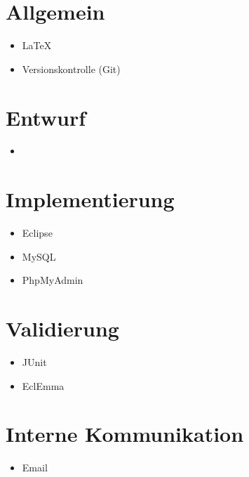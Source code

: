 
\section{Allgemein}
\begin{itemize}
	\item LaTeX
	\item Versionskontrolle (Git)
\end{itemize}
\section{Entwurf}
\begin{itemize}
	\item
\end{itemize}
\section{Implementierung}
\begin{itemize}
	\item Eclipse
	\item MySQL
	\item PhpMyAdmin
\end{itemize}
\section{Validierung}
\begin{itemize}
	\item JUnit
	\item EclEmma
\end{itemize}
\section{Interne Kommunikation}
\begin{itemize}
	\item Email
\end{itemize}

